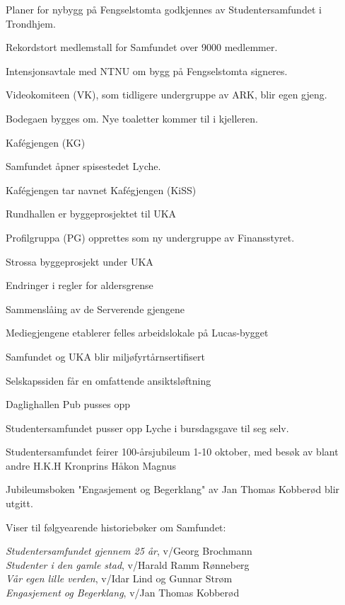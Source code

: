   \item Planer for nybygg på Fengselstomta godkjennes av Studentersamfundet i Trondhjem.
\yearend 

  \item Rekordstort medlemstall for Samfundet over 9000 medlemmer.
  \item Intensjonsavtale med NTNU om bygg på Fengselstomta signeres.
  \item Videokomiteen (VK), som tidligere undergruppe av ARK, blir egen gjeng.
  \item Bodegaen bygges om. Nye toaletter kommer til i kjelleren.
  \item Kafégjengen (KG)
\yearend 

  \item Samfundet åpner spisestedet Lyche.
  \item Kafégjengen tar navnet Kafégjengen (KiSS)
\yearend 

  \item Rundhallen er byggeprosjektet til UKA
  \item Profilgruppa (PG) opprettes som ny undergruppe av Finansstyret.
\yearend 

 \item Strossa byggeprosjekt under UKA
 \item Endringer i regler for aldersgrense
 \item Sammenslåing av de Serverende gjengene
 \item Mediegjengene etablerer felles arbeidslokale på Lucas-bygget
 \item Samfundet og UKA blir miljøfyrtårnsertifisert
 \item Selskapssiden får en omfattende ansiktsløftning
 \item Daglighallen Pub pusses opp
\yearend 

 \item Studentersamfundet pusser opp Lyche i bursdagsgave til seg selv.
 \item Studentersamfundet feirer 100-årsjubileum 1-10 oktober, med besøk av blant andre H.K.H Kronprins Håkon 
 Magnus
 \item Jubileumsboken "Engasjement og Begerklang" av Jan Thomas Kobberød blir utgitt.
\yearend 

Viser til følgyearende historiebøker om Samfundet:

\textit{Studentersamfundet gjennem 25 år}, v/Georg Brochmann\\
\textit{Studenter i den gamle stad}, v/Harald Ramm Rønneberg\\
\textit{Vår egen lille verden}, v/Idar Lind og Gunnar Strøm\\
\textit{Engasjement og Begerklang}, v/Jan Thomas Kobberød
